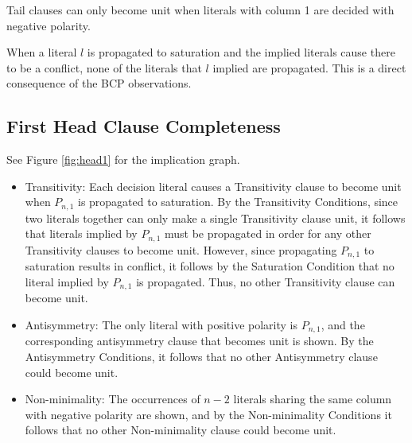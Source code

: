 \documentclass[a4paper,UKenglish,cleveref, autoref, thm-restate]{lipics-v2021}
\begin{document}
\begin{observation} 
Tail clauses can only become unit when literals with column 1 are decided with negative polarity.
\end{observation}

\begin{observation} 
When a literal $l$ is propagated to saturation and the implied literals cause there to be a conflict, none of the literals that $l$ implied are propagated. This is a direct consequence of the BCP observations. 
\end{observation}

\subsection{First Head Clause Completeness}
See Figure \ref{fig:head1} for the implication graph.
\begin{itemize}
    \item Transitivity: Each decision literal causes a Transitivity clause to become unit when $P_{n, 1}$ is propagated to saturation. By the Transitivity Conditions, since two literals together can only make a single Transitivity clause unit, it follows that literals implied by $P_{n, 1}$ must be propagated in order for any other Transitivity clauses to become unit. However, since propagating $P_{n, 1}$ to saturation results in conflict, it follows by the Saturation Condition that no literal implied by $P_{n, 1}$ is propagated. Thus, no other Transitivity clause can become unit. 
    \item Antisymmetry: The only literal with positive polarity is $P_{n, 1}$, and the corresponding antisymmetry clause that becomes unit is shown. By the Antisymmetry Conditions, it follows that no other Antisymmetry clause could become unit. 
    \item Non-minimality: The occurrences of $n - 2$ literals sharing the same column with negative polarity are shown, and by the Non-minimality Conditions it follows that no other Non-minimality clause could become unit. 
\end{itemize}
\end{document}
